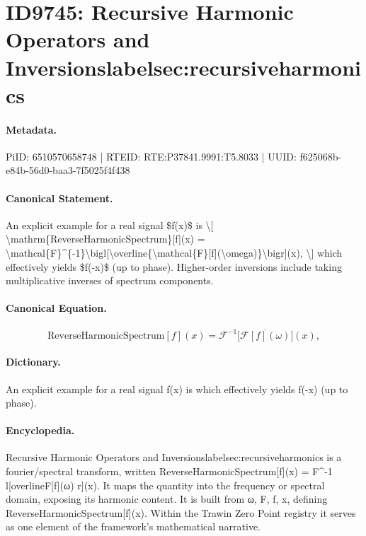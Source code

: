 \section*{ID9745: Recursive Harmonic Operators and Inversionslabelsec:recursiveharmonics}
\paragraph{Metadata.}
PiID: 6510570658748 | RTEID: RTE:P37841.9991:T5.8033 | UUID: f625068b-e84b-56d0-baa3-7f5025f4f438

\paragraph{Canonical Statement.}
An explicit example for a real signal \$f(x)\$ is \textbackslash{}[ \textbackslash{}mathrm\{ReverseHarmonicSpectrum\}[f](x) = \textbackslash{}mathcal\{F\}\textasciicircum{}\{-1\}\textbackslash{}bigl[\textbackslash{}overline\{\textbackslash{}mathcal\{F\}[f](\textbackslash{}omega)\}\textbackslash{}bigr](x), \textbackslash{}] which effectively yields \$f(-x)\$ (up to phase). Higher-order inversions include taking multiplicative inverses of spectrum components.

\paragraph{Canonical Equation.}
\[
\mathrm{ReverseHarmonicSpectrum}[f](x) = \mathcal{F}^{-1}\bigl[\overline{\mathcal{F}[f](\omega)}\bigr](x),
\]

\paragraph{Dictionary.}
An explicit example for a real signal f(x) is which effectively yields f(-x) (up to phase).

\paragraph{Encyclopedia.}
Recursive Harmonic Operators and Inversionslabelsec:recursiveharmonics is a fourier/spectral transform, written ReverseHarmonicSpectrum[f](x) = F\textasciicircum{}-1 l[overlineF[f](ω) r](x). It maps the quantity into the frequency or spectral domain, exposing its harmonic content. It is built from ω, F, f, x, defining ReverseHarmonicSpectrum[f](x). Within the Trawin Zero Point registry it serves as one element of the framework's mathematical narrative.
